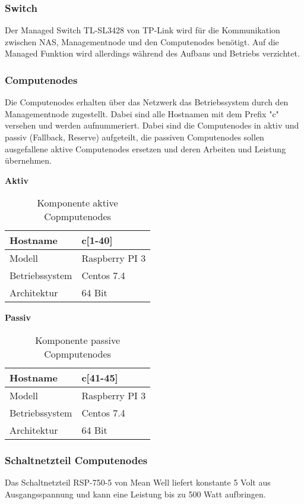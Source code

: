 \subsubsection{Switch}
Der Managed Switch TL-SL3428 von TP-Link wird für die Kommunikation zwischen NAS, Managementnode und den Computenodes benötigt. Auf die Managed Funktion wird allerdings während des Aufbaus und Betriebs verzichtet.

\subsubsection{Computenodes}
Die Computenodes erhalten über das Netzwerk das Betriebssystem durch den Managementnode zugestellt. Dabei sind alle Hostnamen mit dem Prefix "c" versehen und werden aufnummeriert. Dabei sind die Computenodes in aktiv und passiv (Fallback, Reserve) aufgeteilt, die passiven Computenodes sollen ausgefallene aktive Computenodes ersetzen und deren Arbeiten und Leistung übernehmen.

\textbf{Aktiv}
\begin{table}[H]
\centering
\begin{tabular}{|l|l|}
\hline
Hostname & c[1-40] \\\hline
Modell & Raspberry PI 3 \\\hline
Betriebssystem & Centos 7.4 \\\hline
Architektur & 64 Bit \\\hline
\end{tabular}
\caption{Komponente aktive Copmputenodes}
\end{table}

\textbf{Passiv}
\begin{table}[H]
\centering
\begin{tabular}{|l|l|}
\hline
Hostname & c[41-45] \\\hline
Modell & Raspberry PI 3 \\\hline
Betriebssystem & Centos 7.4 \\\hline
Architektur & 64 Bit \\\hline
\end{tabular}
\caption{Komponente passive Copmputenodes}
\end{table}

\subsubsection{Schaltnetzteil Computenodes}
Das Schaltnetzteil RSP-750-5 von Mean Well liefert konstante 5 Volt aus Ausgangsspannung und kann eine Leistung bis zu 500 Watt aufbringen.

